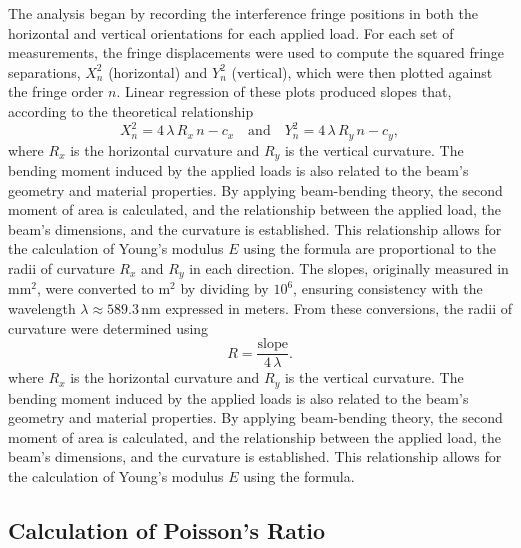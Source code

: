 \documentclass[a4paper,11pt]{article}
\begin{document}
The analysis began by recording the interference fringe positions in both the horizontal and vertical orientations for each applied load. For each set of measurements, the fringe displacements were used to compute the squared fringe separations, \(X_n^2\) (horizontal) and \(Y_n^2\) (vertical), which were then plotted against the fringe order \(n\). Linear regression of these plots produced slopes that, according to the theoretical relationship 
\begin{equation}
X_n^2 = 4\,\lambda\,R_x\,n - c_x \quad \text{and} \quad Y_n^2 = 4\,\lambda\,R_y\,n - c_y,
\end{equation}
where \(R_x\) is the horizontal curvature and \(R_y\) is the vertical curvature. The bending moment induced by the applied loads is also related to the beam's geometry and material properties. By applying beam-bending theory, the second moment of area is calculated, and the relationship between the applied load, the beam's dimensions, and the curvature is established. This relationship allows for the calculation of Young's modulus \(E\) using the formula
are proportional to the radii of curvature \(R_x\) and \(R_y\) in each direction. The slopes, originally measured in \(\mathrm{mm}^2\), were converted to \(\mathrm{m}^2\) by dividing by \(10^6\), ensuring consistency with the wavelength \(\lambda \approx 589.3 \, \mathrm{nm}\) expressed in meters. From these conversions, the radii of curvature were determined using
\begin{equation}
R = \frac{\text{slope}}{4\,\lambda}.
\end{equation}
where \(R_x\) is the horizontal curvature and \(R_y\) is the vertical curvature. The bending moment induced by the applied loads is also related to the beam's geometry and material properties. By applying beam-bending theory, the second moment of area is calculated, and the relationship between the applied load, the beam's dimensions, and the curvature is established. This relationship allows for the calculation of Young's modulus \(E\) using the formula.

\subsection{Calculation of Poisson's Ratio}
\end{document}
